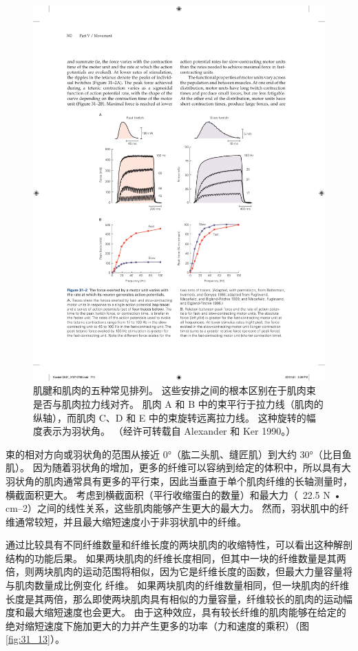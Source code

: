 \begin{figure}[htbp]
	\centering
	\includegraphics[width=0.7\linewidth]{chap31/fig_31_2}
	\caption{肌腱和肌肉的五种常见排列。 这些安排之间的根本区别在于肌肉束是否与肌肉拉力线对齐。 肌肉 A 和 B 中的束平行于拉力线（肌肉的纵轴），而肌肉 C、D 和 E 中的束旋转远离拉力线。 这种旋转的幅度表示为羽状角。 （经许可转载自 Alexander 和 Ker 1990。）}
	\label{fig:31_12}
\end{figure}

束的相对方向或羽状角的范围从接近 0°（肱二头肌、缝匠肌）到大约 30°（比目鱼肌）。 因为随着羽状角的增加，更多的纤维可以容纳到给定的体积中，所以具有大羽状角的肌肉通常具有更多的平行束，因此当垂直于单个肌肉纤维的长轴测量时，横截面积更大。 考虑到横截面积（平行收缩蛋白的数量）和最大力（~22.5 N • cm–2）之间的线性关系，这些肌肉能够产生更大的最大力。 然而，羽状肌中的纤维通常较短，并且最大缩短速度小于非羽状肌中的纤维。

通过比较具有不同纤维数量和纤维长度的两块肌肉的收缩特性，可以看出这种解剖结构的功能后果。 如果两块肌肉的纤维长度相同，但其中一块的纤维数量是其两倍，则两块肌肉的运动范围将相似，因为它是纤维长度的函数，但最大力量容量将与肌肉数量成比例变化 纤维。 如果两块肌肉的纤维数量相同，但一块肌肉的纤维长度是其两倍，那么即使两块肌肉具有相似的力量容量，纤维较长的肌肉的运动幅度和最大缩短速度也会更大。
由于这种效应，具有较长纤维的肌肉能够在给定的绝对缩短速度下施加更大的力并产生更多的功率（力和速度的乘积）（图 \ref{fig:31_13}）。

